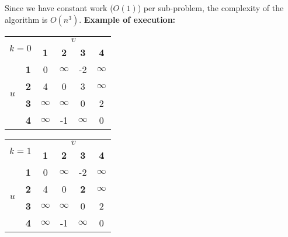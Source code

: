 Since we have constant work ($O(1)$) per sub-problem, the complexity of the algorithm is $O(n^3)$.\newline\newline
\textbf{Example of execution:}\newline
{}

\begin{center}
    \begin{tabular}{|c|c||c|c|c|c|}
        \hline
        \multicolumn{2}{|c|}{\multirow{2}{*}{$k=0$}} & \multicolumn{4}{c|}{$v$}\\
        \cline{3-6}
        \multicolumn{2}{|c|}{} & \textbf{1} & \textbf{2} & \textbf{3} & \textbf{4}\\
        \hline
        \hline
        \multirow{4}{*}{$u$} & \textbf{1} & 0 & $\infty$ & -2 & $\infty$\\
        \cline{2-6}
        & \textbf{2} & 4 & 0 & 3 & $\infty$\\
        \cline{2-6}
        & \textbf{3} & $\infty$ & $\infty$ & 0 & 2\\
        \cline{2-6}
        & \textbf{4} & $\infty$ & -1 & $\infty$ & 0\\
        \cline{2-6}
        \hline
    \end{tabular}
\end{center}

\begin{center}
    \begin{tabular}{|c|c||c|c|c|c|}
        \hline
        \multicolumn{2}{|c|}{\multirow{2}{*}{$k=1$}} & \multicolumn{4}{c|}{$v$}\\
        \cline{3-6}
        \multicolumn{2}{|c|}{} & \textbf{1} & \textbf{2} & \textbf{3} & \textbf{4}\\
        \hline
        \hline
        \multirow{4}{*}{$u$} & \textbf{1} & 0 & $\infty$ & -2 & $\infty$\\
        \cline{2-6}
        & \textbf{2} & 4 & 0 & \textbf{2} & $\infty$\\
        \cline{2-6}
        & \textbf{3} & $\infty$ & $\infty$ & 0 & 2\\
        \cline{2-6}
        & \textbf{4} & $\infty$ & -1 & $\infty$ & 0\\
        \cline{2-6}
        \hline
    \end{tabular}
\end{center}

